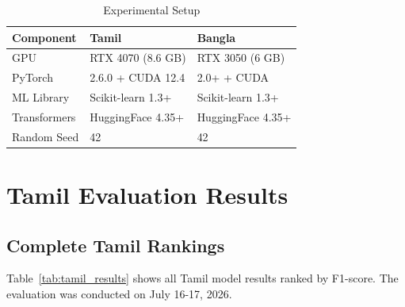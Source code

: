 \documentclass[conference]{IEEEtran}
\begin{document}
\begin{table}[h]
\centering
\caption{Experimental Setup}
\label{tab:hardware}
\begin{tabular}{lll}
\toprule
\textbf{Component} & \textbf{Tamil} & \textbf{Bangla} \\
\midrule
GPU & RTX 4070 (8.6 GB) & RTX 3050 (6 GB) \\
PyTorch & 2.6.0 + CUDA 12.4 & 2.0+ + CUDA \\
ML Library & Scikit-learn 1.3+ & Scikit-learn 1.3+ \\
Transformers & HuggingFace 4.35+ & HuggingFace 4.35+ \\
Random Seed & 42 & 42 \\
\bottomrule
\end{tabular}
\end{table}

\section{Tamil Evaluation Results}

\subsection{Complete Tamil Rankings}

Table~\ref{tab:tamil_results} shows all Tamil model results ranked by F1-score. The evaluation was conducted on July 16-17, 2026.
\end{document}
